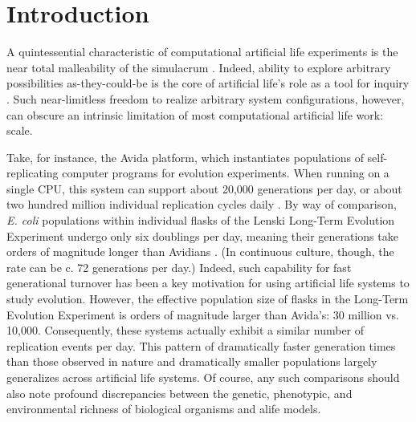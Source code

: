 \section{Introduction}

A quintessential characteristic of computational artificial life experiments is the near total malleability of the simulacrum \citep{pattee1989simulations}.
Indeed, ability to explore arbitrary possibilities as-they-could-be is the core of artificial life's role as a tool for inquiry \citep{langton1997artificial}.
Such near-limitless freedom to realize arbitrary system configurations, however, can obscure an intrinsic limitation of most computational artificial life work: scale.

Take, for instance, the Avida platform, which instantiates populations of self-replicating computer programs for evolution experiments.
When running on a single CPU, this system can support about 20,000 generations per day, or about two hundred million individual replication cycles daily \citep{ofria2009artificial}.
By way of comparison, \textit{E. coli} populations within individual flasks of the Lenski Long-Term Evolution Experiment undergo only six doublings per day, meaning their generations take orders of magnitude longer than Avidians \citep{good2017dynamics}.
(In continuous culture, though, the rate can be c. 72 generations per day.)
Indeed, such capability for fast generational turnover has been a key motivation for using artificial life systems to study evolution.
However, the effective population size of flasks in the Long-Term Evolution Experiment is orders of magnitude larger than Avida's: 30 million vs. 10,000.
Consequently, these systems actually exhibit a similar number of replication events per day.
This pattern of dramatically faster generation times than those observed in nature and dramatically smaller populations largely generalizes across artificial life systems.
Of course, any such comparisons should also note profound discrepancies between the genetic, phenotypic, and environmental richness of biological organisms and alife models.

